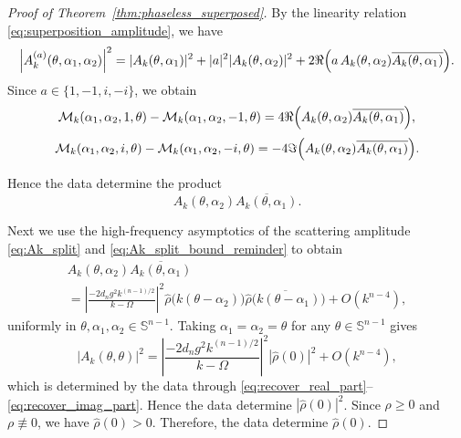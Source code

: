 \documentclass[12pt,a4paper]{amsart}
\numberwithin{equation}{section}
\theoremstyle{plain}
\theoremstyle{definition}
\begin{document}
\begin{proof}[Proof of Theorem~\ref{thm:phaseless_superposed}]
By the linearity relation \eqref{eq:superposition_amplitude}, we have
\begin{equation*}
    \left|A_k^{(a)}(\theta,\alpha_1,\alpha_2)\right|^2
    =
    |A_k(\theta,\alpha_1)|^2
    +
    |a|^2 |A_k(\theta,\alpha_2)|^2
    +
    2\Re\Bigl(
        a\,A_k(\theta,\alpha_2)\overline{A_k(\theta,\alpha_1)}
    \Bigr).
\end{equation*}
Since \(a\in\{1,-1,i,-i\}\), we obtain
\begin{equation}\label{eq:recover_real_part}
    \mathcal M_k(\alpha_1,\alpha_2,1,\theta)
-
\mathcal M_k(\alpha_1,\alpha_2,-1,\theta)
=
4\Re\Bigl(
A_k(\theta,\alpha_2)\overline{A_k(\theta,\alpha_1)}
\Bigr),
\end{equation}
\begin{equation}\label{eq:recover_imag_part}
    \mathcal M_k(\alpha_1,\alpha_2,i,\theta)
-
\mathcal M_k(\alpha_1,\alpha_2,-i,\theta)
=
-4\Im\Bigl(
A_k(\theta,\alpha_2)\overline{A_k(\theta,\alpha_1)}
\Bigr).
\end{equation}


Hence the data determine the product
\begin{equation*}
    A_k(\theta,\alpha_2)\overline{A_k(\theta,\alpha_1)}.
\end{equation*}

Next we use the high-frequency asymptotics of the scattering amplitude \eqref{eq:Ak_split} and \eqref{eq:Ak_split_bound_reminder} to obtain
\begin{multline}\label{eq:cross_asymptotics}
    A_k(\theta,\alpha_2)\overline{A_k(\theta,\alpha_1)}
    \\
    =
    \left|\frac{-2d_n g^2 k^{(n-1)/2}}{k-\Omega}\right|^2
    \widehat{\rho}\bigl(k(\theta-\alpha_2)\bigr)
    \overline{\widehat{\rho}\bigl(k(\theta-\alpha_1)\bigr)}
    +
    O\left(k^{n-4}\right),
\end{multline}
uniformly in \(\theta,\alpha_1,\alpha_2\in\mathbb{S}^{n-1}\). Taking $\alpha_1=\alpha_2=\theta$ for any $\theta\in\mathbb{S}^{n-1}$ gives
\begin{equation*}
    |A_k(\theta,\theta)|^2
    =
    \left|\frac{-2d_n g^2 k^{(n-1)/2}}{k-\Omega}\right|^2
    |\widehat{\rho}(0)|^2
    + O(k^{n-4}),
\end{equation*}
which is determined by the data through
\eqref{eq:recover_real_part}--\eqref{eq:recover_imag_part}. Hence the data
determine $|\widehat{\rho}(0)|^2$. Since \(\rho\ge 0\) and \(\rho\not\equiv 0\), we have $\widehat{\rho}(0)>0$. Therefore, the data determine $\widehat{\rho}(0)$.



\end{proof}
\end{document}
